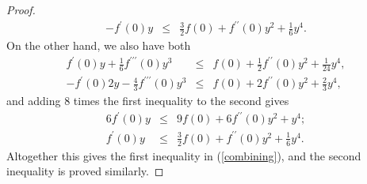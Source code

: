 \documentclass{amsart}
\theoremstyle{plain}
\numberwithin{equation}{section}
\begin{document}
\begin{proof}
\begin{eqnarray*}
-f^{\prime }\left( 0\right) y &\leq &\frac{3}{2}f\left( 0\right) +f^{\prime
\prime }\left( 0\right) y^{2}+\frac{1}{6}y^{4}.
\end{eqnarray*}%
On the other hand, we also have both%
\begin{eqnarray*}
f^{\prime }\left( 0\right) y+\frac{1}{6}f^{\prime \prime \prime }\left(
0\right) y^{3} &\leq &f\left( 0\right) +\frac{1}{2}f^{\prime \prime }\left(
0\right) y^{2}+\frac{1}{24}y^{4}, \\
-f^{\prime }\left( 0\right) 2y-\frac{4}{3}f^{\prime \prime \prime }\left(
0\right) y^{3} &\leq &f\left( 0\right) +2f^{\prime \prime }\left( 0\right)
y^{2}+\frac{2}{3}y^{4},
\end{eqnarray*}%
and adding $8$ times the first inequality to the second gives%
\begin{eqnarray*}
6f^{\prime }\left( 0\right) y &\leq &9f\left( 0\right) +6f^{\prime \prime
}\left( 0\right) y^{2}+y^{4}; \\
f^{\prime }\left( 0\right) y &\leq &\frac{3}{2}f\left( 0\right) +f^{\prime
\prime }\left( 0\right) y^{2}+\frac{1}{6}y^{4}.
\end{eqnarray*}%
Altogether this gives the first inequality in (\ref{combining}), and the
second inequality is proved similarly.


\end{proof}
\end{document}

